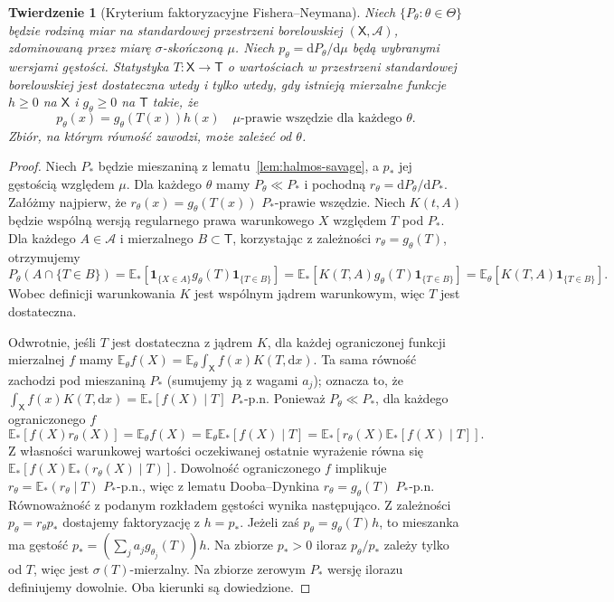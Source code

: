 \documentclass[11pt,a4paper,oneside]{report}
\numberwithin{equation}{chapter}
\theoremstyle{plain}
\newtheorem{twierdzenie}{Twierdzenie}[chapter]
\theoremstyle{definition}
\theoremstyle{remark}
\newcommand{\E}{\mathbb E}
\newcommand{\calA}{\mathcal A}
\newcommand{\ind}[1]{\mathbf 1_{#1}}
\newcommand{\dd}{\mathrm d}
\begin{document}
\begin{twierdzenie}[Kryterium faktoryzacyjne Fishera--Neymana]
\label{thm:factorization}
Niech $\{P_\theta:\theta\in\Theta\}$ będzie rodziną miar na
standardowej przestrzeni borelowskiej $(\mathsf X,\calA)$,
zdominowaną przez miarę $\sigma$-skończoną $\mu$.
Niech $p_\theta=\dd P_\theta/\dd\mu$ będą wybranymi wersjami
gęstości. Statystyka $T:\mathsf X\to\mathsf T$ o wartościach
w przestrzeni standardowej borelowskiej jest dostateczna wtedy
i tylko wtedy, gdy istnieją mierzalne funkcje $h\ge0$ na
$\mathsf X$ i $g_\theta\ge0$ na $\mathsf T$ takie, że
\[
p_\theta(x)=g_\theta(T(x))h(x)
\quad\mu\text{-prawie wszędzie dla każdego }\theta.
\]
Zbiór, na którym równość zawodzi, może zależeć od $\theta$.
\end{twierdzenie}
\begin{proof}
Niech $P_*$ będzie mieszaniną z lematu~\ref{lem:halmos-savage},
a $p_*$ jej gęstością względem $\mu$. Dla każdego $\theta$
mamy $P_\theta\ll P_*$ i pochodną
$r_\theta=\dd P_\theta/\dd P_*$. Załóżmy najpierw,
że $r_\theta(x)=g_\theta(T(x))$ $P_*$-prawie wszędzie.
Niech $K(t,A)$ będzie wspólną wersją regularnego prawa warunkowego
$X$ względem $T$ pod $P_*$. Dla każdego $A\in\calA$
i mierzalnego $B\subset\mathsf T$, korzystając z zależności
$r_\theta=g_\theta(T)$, otrzymujemy
\[
P_\theta(A\cap\{T\in B\})
=\E_*[\ind{\{X\in A\}}g_\theta(T)\ind{\{T\in B\}}]
=\E_*[K(T,A)g_\theta(T)\ind{\{T\in B\}}]
=\E_\theta[K(T,A)\ind{\{T\in B\}}].
\]
Wobec definicji warunkowania $K$ jest wspólnym jądrem warunkowym,
więc $T$ jest dostateczna.

Odwrotnie, jeśli $T$ jest dostateczna z jądrem $K$, dla każdej
ograniczonej funkcji mierzalnej $f$ mamy
$\E_\theta f(X)=\E_\theta\int_{\mathsf X}f(x)K(T,\dd x)$.
Ta sama równość zachodzi pod mieszaniną $P_*$ (sumujemy ją
z wagami $a_j$); oznacza to, że
$\int_{\mathsf X}f(x)K(T,\dd x)=\E_*[f(X)\mid T]$ $P_*$-p.n.
Ponieważ $P_\theta\ll P_*$, dla każdego ograniczonego $f$
\[
\E_*[f(X)r_\theta(X)]
=\E_\theta f(X)
=\E_\theta\E_*[f(X)\mid T]
=\E_*[r_\theta(X)\E_*[f(X)\mid T]].
\]
Z własności warunkowej wartości oczekiwanej ostatnie wyrażenie
równa się $\E_*[f(X)\E_*(r_\theta(X)\mid T)]$.
Dowolność ograniczonego $f$ implikuje
$r_\theta=\E_*(r_\theta\mid T)$ $P_*$-p.n., więc z lematu
Dooba--Dynkina $r_\theta=g_\theta(T)$ $P_*$-p.n.
Równoważność z podanym rozkładem gęstości wynika następująco.
Z zależności $p_\theta=r_\theta p_*$ dostajemy faktoryzację
z $h=p_*$. Jeżeli zaś
$p_\theta=g_\theta(T)h$, to mieszanka ma gęstość
$p_*=(\sum_j a_jg_{\theta_j}(T))h$.
Na zbiorze $p_*>0$ iloraz $p_\theta/p_*$ zależy tylko od $T$,
więc jest $\sigma(T)$-mierzalny. Na zbiorze zerowym $P_*$
wersję ilorazu definiujemy dowolnie. Oba kierunki są dowiedzione.
\end{proof}
\end{document}
